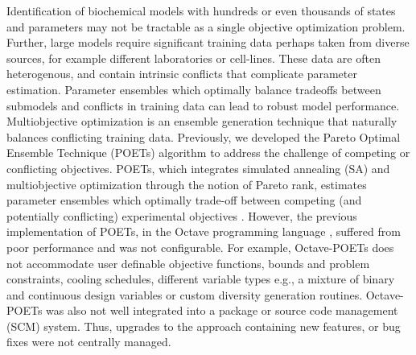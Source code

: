\documentclass{bmcart}
\begin{document}
Identification of biochemical models with hundreds or even thousands of states and parameters may not be tractable as a single objective optimization problem.
Further, large models require significant training data perhaps taken from diverse sources, for example different laboratories or cell-lines.
These data are often heterogenous, and contain intrinsic conflicts that complicate parameter estimation.
Parameter ensembles which optimally balance tradeoffs between submodels and conflicts in training data can
lead to robust model performance. Multiobjective optimization is an ensemble generation technique that naturally balances conflicting training data.
Previously, we developed the Pareto Optimal Ensemble Technique (POETs) algorithm to address the challenge of competing or conflicting objectives.
POETs, which integrates simulated annealing (SA) and multiobjective optimization through the notion of Pareto rank, estimates parameter ensembles which optimally trade-off between
competing (and potentially conflicting) experimental objectives \cite{Song:2010aa}.
However, the previous implementation of POETs, in the Octave programming language \cite{CITE_Octave}, suffered from poor performance and was not configurable.
For example, Octave-POETs does not accommodate user definable objective functions, bounds and problem constraints, cooling schedules, different variable types e.g., a mixture of binary and continuous design variables or custom diversity generation routines. Octave-POETs was also not well integrated into a package or
source code management (SCM) system. Thus, upgrades to the approach containing new features, or bug fixes were not centrally managed.
\end{document}
